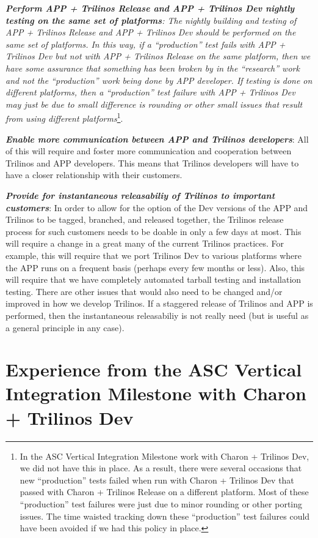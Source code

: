 \documentclass[pdf,ps2pdf,11pt]{SANDreport}
\begin{document}
{}\textit{\textbf{Perform APP + Trilinos Release and APP + Trilinos Dev
nightly testing on the same set of platforms}: The nightly building and
testing of APP + Trilinos Release and APP + Trilinos Dev should be performed
on the same set of platforms.  In this way, if a ``production'' test fails
with APP + Trilinos Dev but not with APP + Trilinos Release on the same
platform, then we have some assurance that something has been broken by in the
``research'' work and not the ``production'' work being done by APP developer.
If testing is done on different platforms, then a ``production'' test failure
with APP + Trilinos Dev may just be due to small difference is rounding or
other small issues that result from using different platforms}\footnote{In the
ASC Vertical Integration Milestone work with Charon + Trilinos Dev, we did not
have this in place.  As a result, there were several occasions that new
``production'' tests failed when run with Charon + Trilinos Dev that passed
with Charon + Trilinos Release on a different platform.  Most of these
``production'' test failures were just due to minor rounding or other porting
issues.  The time waisted tracking down these ``production'' test failures
could have been avoided if we had this policy in place.}.

{}\textit{\textbf{Enable more communication between APP and Trilinos
developers}}: All of this will require and foster more communication and
cooperation between Trilinos and APP developers.  This means that Trilinos
developers will have to have a closer relationship with their customers.

{}\textit{\textbf{Provide for instantaneous releasabiliy of Trilinos to
important customers}}: In order to allow for the option of the Dev versions of
the APP and Trilinos to be tagged, branched, and released together, the
Trilinos release process for such customers needs to be doable in only a few
days at most.  This will require a change in a great many of the current
Trilinos practices.  For example, this will require that we port Trilinos Dev
to various platforms where the APP runs on a frequent basis (perhaps every few
months or less).  Also, this will require that we have completely automated
tarball testing and installation testing.  There are other issues that would
also need to be changed and/or improved in how we develop Trilinos.  If a
staggered release of Trilinos and APP is performed, then the instantaneous
releasabiliy is not really need (but is useful as a general principle in any
case).


%
\section{Experience from the ASC Vertical Integration Milestone with Charon + Trilinos Dev}
%
\end{document}
